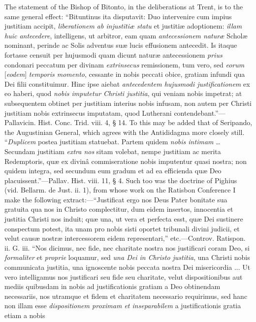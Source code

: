 The statement of the Bishop of Bitonto, in the deliberations at
Trent, is to the same general effect: ``Bituntinus ita disputavit:
Duo intervenire cum impius justitiam accipit, \emph{liberationem ab
injustitiæ statu} et justitiæ adoptionem: \emph{illam huic
antecedere}, intelligens, ut arbitror, eam quam \emph{antecessionem
naturæ} Scholæ nominant, perinde ac Solis adventus suæ lucis
effusionem antecedit. Is itaque fortasse censuit per hujusmodi quam
dicunt naturæ antecessionem \emph{prius} condonari peccatum per
divinam \emph{extrinsecus} remissionem, tum vero, sed \emph{eorum} [\emph{eodem}]
\emph{temporis momento}, cessante in nobis peccati obice, gratiam
infundi qua Dei filii constituimur. Hinc ipse aiebat \emph{antecedentem
hujusmodi justificationem} ex eo haberi, quod \emph{nobis imputetur
Christi justitia}, qui veniam nobis impetrat; at subsequentem
obtinet per justitiam interius nobis infusam, non autem per Christi
justitiam nobis extrinsecus imputatam, quod Lutherani contendebant.''—Pallavicin.
Hist. Conc. Trid. viii. 4, § 14. To this may be added that of
Seripando, the Augustinian General, which agrees with the Antididagma
more closely still. ``\emph{Duplicem} postea justitiam statuebat.
Partem quidem \emph{nobis intimam} … Secundam justitiam \emph{extra nos}
sitam volebat, nempe justitiam ac merita Redemptoris, quæ ex divinâ
commiseratione nobis imputentur quasi nostra; non quidem integra, sed
secundum eum gradum et ad ea efficienda quæ Deo placuissent.''—Pallav.
Hist. viii. 11, § 4. Such too was the doctrine of Pighius (vid.
Bellarm. de Just. ii. 1), from whose work on the Ratisbon Conference I
make the following extract:—``Justificat ergo nos Deus Pater
bonitate sua gratuita qua nos in Christo complectitur, dum eidem
insertos, innocentia et justitia Christi nos induit; quæ una, ut vera
et perfecta esst, quæ Dei sustinere conspectum potest, ita unam pro
nobis sisti oportet tribunali divini judicii, et velut causæ nostræ
intercessorem eidem representari,'' etc.—Controv. Ratispon. ii.
G. iii. ``Nos dicimus, nec fide, nec charitate nostra nos
justificari coram Deo, si \emph{formaliter} et \emph{proprie} loquamur, sed \emph{una Dei in Christo justitia}, una Christi nobis
communicata justitia, una ignoscente nobis peccata nostra Dei
misericordia ... Ut vero intelligamus nos justificari seu fide seu
charitate, velut dispositionibus aut mediis quibusdam in nobis ad
justificationis gratiam a Deo obtinendam necessariis, nos utramque et
fidem et charitatem necessario requirimus, sed hanc non illam esse \emph{dispositionem
proximam et inseparabilem} a justificationis gratia etiam a nobis
